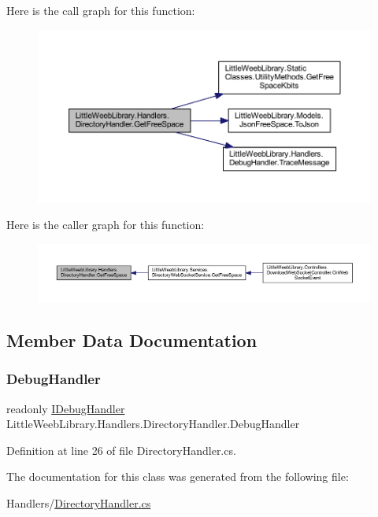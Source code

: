 Here is the call graph for this function\+:\nopagebreak
\begin{figure}[H]
\begin{center}
\leavevmode
\includegraphics[width=350pt]{class_little_weeb_library_1_1_handlers_1_1_directory_handler_aa439a303572de6bf09438d38a7fa4698_cgraph}
\end{center}
\end{figure}
Here is the caller graph for this function\+:\nopagebreak
\begin{figure}[H]
\begin{center}
\leavevmode
\includegraphics[width=350pt]{class_little_weeb_library_1_1_handlers_1_1_directory_handler_aa439a303572de6bf09438d38a7fa4698_icgraph}
\end{center}
\end{figure}


\subsection{Member Data Documentation}
\mbox{\label{class_little_weeb_library_1_1_handlers_1_1_directory_handler_adb882b8ec72046e2b95b6d11228f6927}} 
\subsubsection{\texorpdfstring{Debug\+Handler}{DebugHandler}}
{\footnotesize\ttfamily readonly \mbox{\hyperlink{interface_little_weeb_library_1_1_handlers_1_1_i_debug_handler}{I\+Debug\+Handler}} Little\+Weeb\+Library.\+Handlers.\+Directory\+Handler.\+Debug\+Handler\hspace{0.3cm}{\ttfamily [private]}}



Definition at line 26 of file Directory\+Handler.\+cs.



The documentation for this class was generated from the following file\+:\begin{DoxyCompactItemize}
\item 
Handlers/\mbox{\hyperlink{_directory_handler_8cs}{Directory\+Handler.\+cs}}\end{DoxyCompactItemize}
